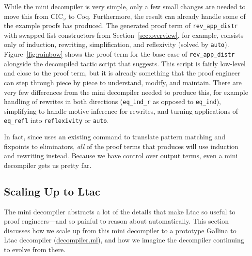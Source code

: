 While the mini decompiler is very simple, only a few small changes are needed
to move this from CIC$_{\omega}$ to Coq.
Furthermore, the result can already handle some of the example proofs \toolname has produced.
The generated proof term of \lstinline{rev_app_distr} with swapped list constructors from Section~\ref{sec:overview},
for example, consists only of induction, rewriting, simplification, and reflexivity (solved by \lstinline{auto}).
Figure~\ref{fig:rainbow} shows the proof term for the base case of \lstinline{rev_app_distr} 
alongside the decompiled tactic script that \toolname suggests.
This script is fairly low-level and close to the proof term, but it is already something that the proof engineer
can step through piece by piece to understand, modify, and maintain.
There are very few differences from the mini decompiler needed to produce this,
for example handling of rewrites in both directions (\lstinline{eq_ind_r} as opposed to \lstinline{eq_ind}),
simplifying to handle motive inference for rewrites,
and turning applications of \lstinline{eq_refl} into \lstinline{reflexivity} or \lstinline{auto}.

In fact, since \toolname uses an existing command to translate pattern matching and fixpoints to eliminators,
\textit{all} of the proof terms that \toolname produces will use induction and rewriting instead.
Because we have control over output terms, even a mini decompiler gets us pretty far.


\subsection{Scaling Up to Ltac}
\label{sec:second}

The mini decompiler abstracts a lot of the details that make Ltac so useful to proof engineers---and so painful to 
reason about automatically.
This section discusses how we scale up from this mini decompiler to a prototype Gallina to Ltac decompiler (\href{https://github.com/uwplse/coq-plugin-lib/blob/master/src/coq/decompiler/decompiler.ml}{decompiler.ml}),
and how we imagine the decompiler continuing to evolve from there.


